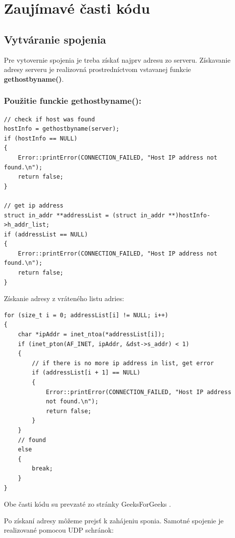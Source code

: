 \section{Zaujímavé časti kódu}
\label{Zaujímavé časti kódu}

\subsection{Vytváranie spojenia}
\label{Vytváranie spojenia}
Pre vytovernie spojenia je treba získať najprv adresu zo serveru. Získavanie adresy serveru je realizovná prostredníctvom vstavanej funkcie 
\textbf{gethostbyname()}.


\subsubsection{Použitie funckie gethostbyname():}
\begin{verbatim}
// check if host was found
hostInfo = gethostbyname(server);
if (hostInfo == NULL)
{
    Error::printError(CONNECTION_FAILED, "Host IP address not found.\n");
    return false;
}

// get ip address
struct in_addr **addressList = (struct in_addr **)hostInfo->h_addr_list;
if (addressList == NULL)
{
    Error::printError(CONNECTION_FAILED, "Host IP address not found.\n");
    return false;
}
\end{verbatim}

\newpage
\noindent Získanie adresy z vráteného listu adries:
\begin{verbatim}
for (size_t i = 0; addressList[i] != NULL; i++)
{
    char *ipAddr = inet_ntoa(*addressList[i]);
    if (inet_pton(AF_INET, ipAddr, &dst->s_addr) < 1)
    {
        // if there is no more ip address in list, get error
        if (addressList[i + 1] == NULL)
        {
            Error::printError(CONNECTION_FAILED, "Host IP address 
            not found.\n");
            return false;
        }
    }
    // found
    else
    {
        break;
    }
}
\end{verbatim}

\noindent Obe časti kódu su prevzaté zo stránky GeeksForGeeks \cite{gethostbyname}.

Po získaní adresy môžeme prejsť k zahájeniu sponia. Samotné spojenie je realizované pomocou UDP schránok:

